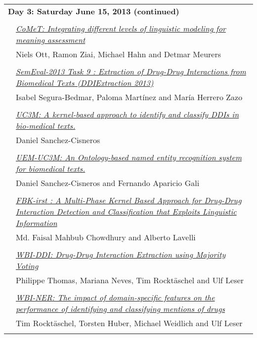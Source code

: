 \begin{tabular}{p{20mm}p{138mm}}
\\
\multicolumn{2}{l}{\bf Day 3: Saturday June 15, 2013 (continued)} \\\\
 & \hyperlink{page.608}{\em CoMeT: Integrating different levels of linguistic modeling for meaning assessment}\\
         & Niels Ott, Ramon Ziai, Michael Hahn and Detmar Meurers \\
\\

& \hyperlink{page.341}{\em SemEval-2013 Task 9 : Extraction of Drug-Drug Interactions from Biomedical Texts (DDIExtraction 2013)}\\
         & Isabel Segura-Bedmar, Paloma Mart\'{i}nez and Mar\'{i}a Herrero Zazo \\
\\

 & \hyperlink{page.617}{\em UC3M: A kernel-based approach to identify and classify DDIs in bio-medical texts.}\\
         & Daniel Sanchez-Cisneros \\
\\

 & \hyperlink{page.622}{\em UEM-UC3M: An Ontology-based named entity recognition system for biomedical texts.}\\
         & Daniel Sanchez-Cisneros and Fernando Aparicio Gali \\
\\

& \hyperlink{page.351}{\em FBK-irst : A Multi-Phase Kernel Based Approach for Drug-Drug Interaction Detection and Classification that Exploits Linguistic Information}\\
         & Md. Faisal Mahbub Chowdhury and Alberto Lavelli \\
\\


 & \hyperlink{page.628}{\em WBI-DDI: Drug-Drug Interaction Extraction using Majority Voting}\\
         & Philippe Thomas, Mariana Neves, Tim Rockt\"{a}schel and Ulf Leser \\
\\

& \hyperlink{page.356}{\em WBI-NER: The impact of domain-specific features on the performance of identifying and classifying mentions of drugs}\\
         & Tim Rockt\"{a}schel, Torsten Huber, Michael Weidlich and Ulf Leser \\
\\



\end{tabular}
